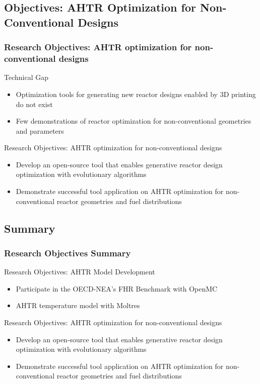 \subsection{Objectives: AHTR Optimization for Non-Conventional Designs}
\begin{frame}
    \frametitle{Research Objectives: AHTR optimization for non-conventional designs}
    \begin{block}{Technical Gap}
      \begin{itemize}
        \item Optimization tools for generating new reactor designs enabled by
        3D printing do not exist
        \item Few demonstrations of reactor optimization for non-conventional 
        geometries and parameters 
      \end{itemize}
    \end{block}
    \begin{block}{Research Objectives: AHTR optimization for non-conventional designs}
        \begin{itemize}
            \item Develop an open-source tool that enables generative reactor design 
            optimization with evolutionary algorithms 
            \item Demonstrate successful tool application on AHTR optimization for 
            non-conventional reactor geometries and fuel distributions
        \end{itemize}
    \end{block}
  \end{frame}

\subsection{Summary}
\begin{frame}
    \frametitle{Research Objectives Summary}
    \begin{block}{Research Objectives: AHTR Model Development}
        \begin{itemize}
            \item Participate in the OECD-NEA's FHR Benchmark with OpenMC \cite{romano_openmc:_2015}
            \item AHTR temperature model with Moltres \cite{lindsay_moltres_2017}
        \end{itemize}
    \end{block}

    \begin{block}{Research Objectives: AHTR optimization for non-conventional designs}
        \begin{itemize}
            \item Develop an open-source tool that enables generative reactor design 
            optimization with evolutionary algorithms 
            \item Demonstrate successful tool application on AHTR optimization for 
            non-conventional reactor geometries and fuel distributions
        \end{itemize}
    \end{block}
\end{frame}